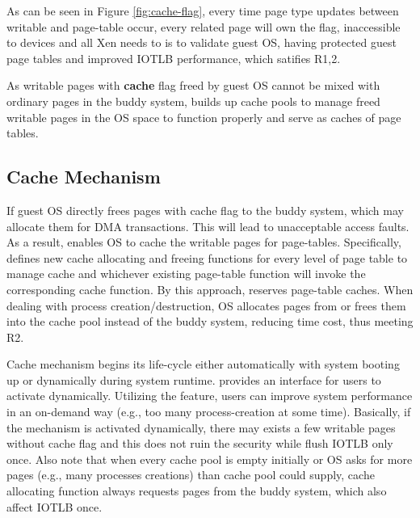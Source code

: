 As can be seen in Figure \ref{fig:cache-flag}, every time page type updates between writable and page-table occur, every related page will own the flag, inaccessible to devices and all Xen needs to is to validate guest OS, having protected guest page tables and improved IOTLB performance, which satifies R1,2.

As writable pages with \textbf{cache} flag freed by guest OS cannot be mixed with ordinary pages in the buddy system, \name builds up cache pools to manage freed writable pages in the OS space to function properly and serve as caches of page tables.

\subsection{Cache Mechanism}
If guest OS directly frees pages with cache flag to the buddy system, which may allocate them for DMA transactions. This will lead to unacceptable access faults. As a result, \name enables OS to cache the writable pages for page-tables. Specifically, \name defines new cache allocating and freeing functions for every level of page table to manage cache and whichever existing page-table function will invoke the corresponding cache function. By this approach, \name reserves page-table caches. When dealing with process creation/destruction, OS allocates pages from or frees them into the cache pool instead of the buddy system, reducing time cost, thus meeting R2.

Cache mechanism begins its life-cycle either automatically with system booting up or dynamically during system runtime. \name provides an interface for users to activate dynamically. Utilizing the feature, users can improve system performance in an on-demand way (e.g., too many process-creation at some time). Basically, if the mechanism is activated dynamically, there may exists a few writable pages without cache flag and this does not ruin the security while flush IOTLB only once. Also note that when every cache pool is empty initially or OS asks for more pages (e.g., many processes creations) than cache pool could supply, cache allocating function always requests pages from the buddy system, which also affect IOTLB once.

